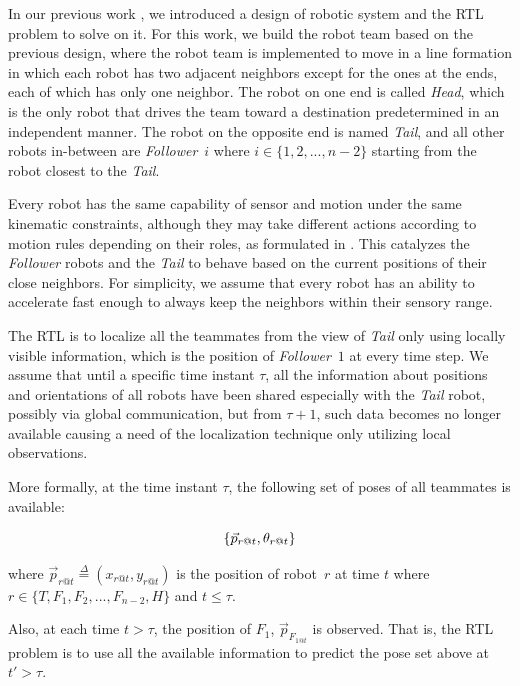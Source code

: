 \documentclass[letterpaper, 10 pt, conference]{ieeeconf}  %
\begin{document}
	In our previous work \cite{CPR17} , we introduced a design of robotic system and the RTL
	problem to solve on it.
	For this work, we build the robot team based on the previous design, where
	the robot team is implemented to move in a line formation
	in which each robot has two adjacent neighbors except for the ones at the ends,
	each of which has only one neighbor.
	The robot on one end is called \emph{Head}, which is the only robot that
	drives the team toward a destination predetermined in an independent manner.
	The robot on the opposite end is named \emph{Tail}, and all other robots
	in-between are \emph{Follower}~$i$ where $i \in \{1, 2, ..., n-2\}$ starting
	from the robot closest to the \emph{Tail}.

	Every robot has the same capability of sensor and motion under the same
	kinematic constraints, although they may take different actions according to
	motion rules depending on their roles, as formulated in \cite{CPR17}. This catalyzes the
	 \emph{Follower} robots and the \emph{Tail} to behave based on the current positions of their close neighbors. For simplicity, we assume that every robot
	 has an ability to accelerate fast enough to always keep the neighbors within their
	 sensory range.

	The RTL is to localize all the teammates from the view of
	\emph{Tail} only using locally visible information, which is the position of
	\emph{Follower}~$1$ at every time step.
	We assume that until a specific time instant
	$\tau$, all the information about positions and orientations of all robots
	have been shared especially with the \emph{Tail} robot,
	possibly via global communication,
	but from $\tau+1$, such data becomes no longer available causing a need of the
	localization technique only utilizing local observations.

	More formally, at the time instant $\tau$, the following set of poses of all teammates is
	available:

	\begin{equation*}
		\{\vec{p}_{r@t},\theta_{r@t}\} \\
	\label{eq:pose_set}
	\end{equation*}

	where $\vec{p}_{r@t} \overset{\Delta}{=}(x_{r@t}, y_{r@t})$ is the position of robot~$r$
	at time $t$
	where  $r \in \{T, F_{1}, F_{2}, ..., F_{n-2}, H\}$ and $t \leq \tau$.

	Also, at each time $t > \tau$, the position of $F_1$, $\vec{p}_{F_{1@t}}$ is observed.
	That is, the RTL problem is to use all the available information to predict
	the pose set above at $t' > \tau$.
\end{document}
